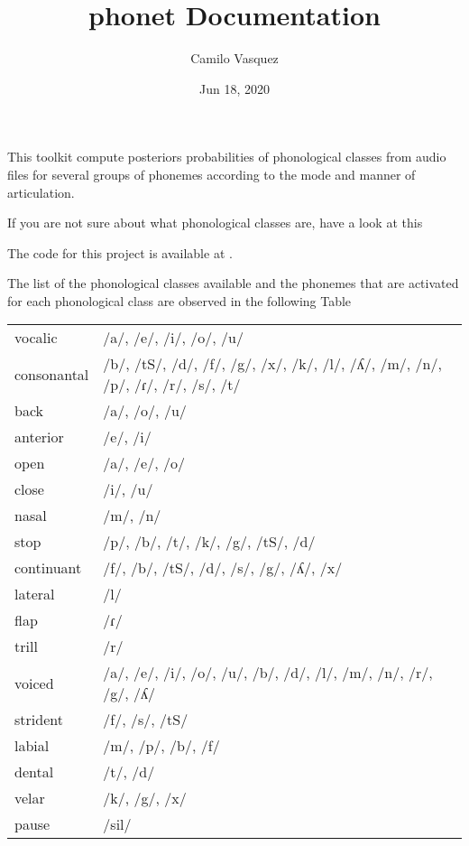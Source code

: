 \documentclass[letterpaper,10pt,english]{sphinxmanual}
\title{phonet Documentation}
\date{Jun 18, 2020}
\author{Camilo Vasquez}
\begin{document}
\maketitle
\sphinxtableofcontents
{}\label{\detokenize{index::doc}}


This toolkit compute posteriors probabilities of phonological classes from audio files for several groups of phonemes according to the mode and manner of articulation.

If you are not sure about what phonological classes are, have a look at this

The code for this project is available at  .

The list of the phonological classes available and the phonemes that are activated for each phonological class are observed in the following Table

\noindent\begin{tabulary}{\linewidth}{|L|L|}
\hline
{}\relax &\relax \\
\hline
vocalic
&
/a/, /e/, /i/, /o/, /u/
\\
\hline
consonantal
&
/b/, /tS/, /d/, /f/, /g/, /x/, /k/, /l/, /ʎ/, /m/, /n/, /p/, /ɾ/, /r/, /s/, /t/
\\
\hline
back
&
/a/, /o/, /u/
\\
\hline
anterior
&
/e/, /i/
\\
\hline
open
&
/a/, /e/, /o/
\\
\hline
close
&
/i/, /u/
\\
\hline
nasal
&
/m/, /n/
\\
\hline
stop
&
/p/, /b/, /t/, /k/, /g/, /tS/, /d/
\\
\hline
continuant
&
/f/, /b/, /tS/, /d/, /s/, /g/, /ʎ/, /x/
\\
\hline
lateral
&
/l/
\\
\hline
flap
&
/ɾ/
\\
\hline
trill
&
/r/
\\
\hline
voiced
&
/a/, /e/, /i/, /o/, /u/, /b/, /d/, /l/, /m/, /n/, /r/, /g/, /ʎ/
\\
\hline
strident
&
/f/, /s/, /tS/
\\
\hline
labial
&
/m/, /p/, /b/, /f/
\\
\hline
dental
&
/t/, /d/
\\
\hline
velar
&
/k/, /g/, /x/
\\
\hline
pause
&
/sil/
\\
\hline\end{tabulary}
\end{document}
